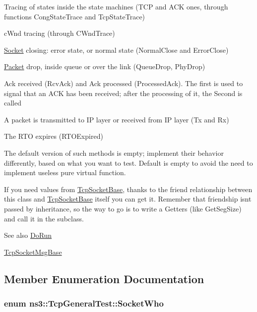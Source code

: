 \begin{DoxyItemize}
\item Tracing of states inside the state machines (T\+CP and A\+CK ones, through functions Cong\+State\+Trace and Tcp\+State\+Trace)
\item c\+Wnd tracing (through C\+Wnd\+Trace)
\item \hyperlink{classns3_1_1Socket}{Socket} closing\+: error state, or normal state (Normal\+Close and Error\+Close)
\item \hyperlink{classns3_1_1Packet}{Packet} drop, inside queue or over the link (Queue\+Drop, Phy\+Drop)
\item Ack received (Rcv\+Ack) and Ack processed (Processed\+Ack). The first is used to signal that an A\+CK has been received; after the processing of it, the Second is called
\item A packet is transmitted to IP layer or received from IP layer (Tx and Rx)
\item The R\+TO expires (R\+T\+O\+Expired)
\end{DoxyItemize}

The default version of such methods is empty; implement their behavior differently, based on what you want to test. Default is empty to avoid the need to implement useless pure virtual function.

If you need values from \hyperlink{classns3_1_1TcpSocketBase}{Tcp\+Socket\+Base}, thanks to the friend relationship between this class and \hyperlink{classns3_1_1TcpSocketBase}{Tcp\+Socket\+Base} itself you can get it. Remember that friendship isn\textquotesingle{}t passed by inheritance, so the way to go is to write a Getters (like Get\+Seg\+Size) and call it in the subclass.

\begin{DoxySeeAlso}{See also}
\hyperlink{classns3_1_1TcpGeneralTest_a79f00453e60b95fcf8d22757593f5ed3}{Do\+Run} 

\hyperlink{classns3_1_1TcpSocketMsgBase}{Tcp\+Socket\+Msg\+Base} 
\end{DoxySeeAlso}


\subsection{Member Enumeration Documentation}
\subsubsection[{\texorpdfstring{Socket\+Who}{SocketWho}}]{\setlength{\rightskip}{0pt plus 5cm}enum {\bf ns3\+::\+Tcp\+General\+Test\+::\+Socket\+Who}}\hypertarget{classns3_1_1TcpGeneralTest_a29338e6b7137cad650c2ff835713f6ee}{}\label{classns3_1_1TcpGeneralTest_a29338e6b7137cad650c2ff835713f6ee}


